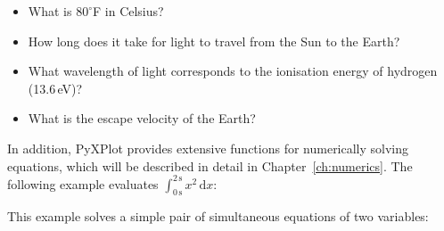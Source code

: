 \begin{itemize}
\item What is $80^\circ$F in Celsius?

\vspace{3mm}
\newline
{}
\vspace{3mm}

\item How long does it take for light to travel from the Sun to the Earth?

\vspace{3mm}
\newline
{}
\vspace{3mm}

\item What wavelength of light corresponds to the ionisation energy of hydrogen (13.6\,eV)?

\vspace{3mm}
\newline
{}
\vspace{3mm}

\item What is the escape velocity of the Earth?

\vspace{3mm}
\newline
{}
\vspace{3mm}
\end{itemize}

In addition, PyXPlot provides extensive functions for numerically solving
equations, which will be described in detail in Chapter~\ref{ch:numerics}. The
following example evaluates $\int_{0\,\mathrm{s}}^{2\,\mathrm{s}}
x^2\,\mathrm{d}x$:

\vspace{3mm}
\newline
{}
\vspace{3mm}

\noindent This example solves a simple pair of simultaneous equations of two variables:

\vspace{3mm}
\newline
{}\newline
{}
\vspace{3mm}

